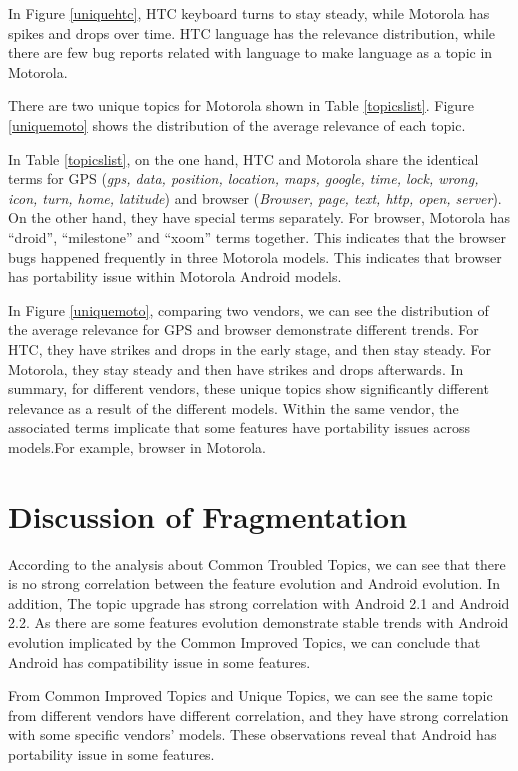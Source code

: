 \documentclass[10pt, conference, compsocconf]{IEEEtran}
\begin{document}
In Figure \ref{uniquehtc}, HTC keyboard turns to stay steady, while Motorola has spikes and drops over time. HTC language has the relevance distribution, while there are few bug reports related with language to make language as a topic in Motorola.

There are two unique topics for Motorola shown in Table \ref{topicslist}. Figure \ref{uniquemoto} shows the distribution of the average relevance of each topic.

In Table \ref{topicslist}, on the one hand, HTC and Motorola share the identical terms for GPS (\textit{gps, data, position, location, maps, google, time, lock, wrong, icon, turn, home, latitude}) and browser (\textit{Browser, page, text, http, open, server}). On the other hand, they have special terms separately. For browser, Motorola has “droid”, “milestone” and “xoom” terms together. This indicates that the browser bugs happened frequently in three Motorola models. This indicates that browser has portability issue within Motorola Android models.

In Figure \ref{uniquemoto}, comparing two vendors, we can see the distribution of the average relevance for GPS and browser demonstrate different trends. For HTC, they have strikes and drops in the early stage, and then stay steady. For Motorola, they stay steady and then have strikes and drops afterwards.
In summary, for different vendors, these unique topics show significantly different relevance as a result of the different models. Within the same vendor, the associated terms implicate that some features have portability issues across models.For example, browser in Motorola.

\section{Discussion of Fragmentation}
According to the analysis about Common Troubled Topics, we can see that there is no strong correlation between the feature evolution and Android evolution. In addition, The topic upgrade has strong correlation with Android 2.1 and Android 2.2. As there are some features evolution demonstrate stable trends with Android evolution implicated by the Common Improved Topics, we can conclude that Android has compatibility issue in some features.

From Common Improved Topics and Unique Topics, we can see the same topic from different vendors have different correlation, and they have strong correlation with some specific vendors' models. These observations reveal that Android has portability issue in some features.
\end{document}
